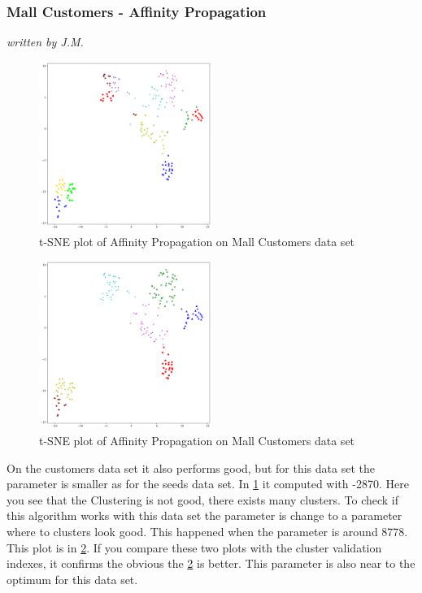 \subsubsection{Mall Customers - Affinity Propagation}
\textit{written by J.M.}\\

 \begin{figure}[!ht]
 	\begin{center}
 		\includegraphics[width=0.5\textwidth]{images/af_mallcustomers2870.png}
 	\end{center}
 	\caption{t-SNE plot of Affinity Propagation on Mall Customers data set}
 	\label{fig:af_mall1}
 \end{figure}
 
 \begin{figure}[!ht]
 		\begin{center}
 			\includegraphics[width=0.5\textwidth]{images/af_mallcustomers8778.png}
 		\end{center}
 		\caption{t-SNE plot of Affinity Propagation on Mall Customers data set}
 		\label{fig:af_mall2}
 	\end{figure}
 
On the customers data set it also performs good, but for this data set the parameter is smaller as for the seeds data set. In \ref{fig:af_mall1} it computed with -2870. Here you see that the Clustering is not good, there exists many clusters. To check if this algorithm works with this data set the parameter is change to a parameter where to clusters look good. This happened when the parameter is around 8778. This plot is in \ref{fig:af_mall2}. If you compare these two plots with the cluster validation indexes, it confirms the obvious the \ref{fig:af_mall2} is better. This parameter is also near to the optimum for this data set. 

